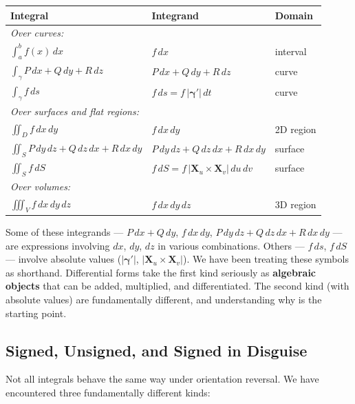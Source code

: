 \documentclass[11pt]{report}
\begin{document}
\begin{center}
\renewcommand{\arraystretch}{1.4}
\begin{tabular}{|l|l|l|}
\hline
\textbf{Integral} & \textbf{Integrand} & \textbf{Domain} \\
\hline
\multicolumn{3}{|l|}{\textit{Over curves:}} \\
\hline
$\int_a^b f(x) \, dx$ & $f \, dx$ & interval \\
\hline
$\int_\gamma P \, dx + Q \, dy + R\,dz$ & $P \, dx + Q \, dy + R\,dz$ & curve \\
\hline
$\int_\gamma f \, ds$ & $f \, ds = f\,|\boldsymbol{\gamma}'|\,dt$ & curve \\
\hline
\multicolumn{3}{|l|}{\textit{Over surfaces and flat regions:}} \\
\hline
$\iint_D f \, dx \, dy$ & $f \, dx \, dy$ & 2D region \\
\hline
$\iint_S P \, dy \, dz + Q \, dz \, dx + R \, dx \, dy$ & $P \, dy\, dz + Q \, dz \, dx + R \, dx \, dy$ & surface \\
\hline
$\iint_S f \, dS$ & $f\,dS = f\,|\mathbf{X}_u \times \mathbf{X}_v|\,du\,dv$ & surface \\
\hline
\multicolumn{3}{|l|}{\textit{Over volumes:}} \\
\hline
$\iiint_V f \, dx \, dy \, dz$ & $f \, dx \, dy \, dz$ & 3D region \\
\hline
\end{tabular}
\end{center}

Some of these integrands --- $P\,dx + Q\,dy$, $f\,dx\,dy$, $P\,dy\,dz + Q\,dz\,dx + R\,dx\,dy$ --- are expressions involving $dx$, $dy$, $dz$ in various combinations. Others --- $f\,ds$, $f\,dS$ --- involve absolute values ($|\boldsymbol{\gamma}'|$, $|\mathbf{X}_u \times \mathbf{X}_v|$). We have been treating these symbols as shorthand. Differential forms take the first kind seriously as \textbf{algebraic objects} that can be added, multiplied, and differentiated. The second kind (with absolute values) are fundamentally different, and understanding why is the starting point.

\subsection{Signed, Unsigned, and Signed in Disguise}

Not all integrals behave the same way under orientation reversal. We have encountered three fundamentally different kinds:
\end{document}
